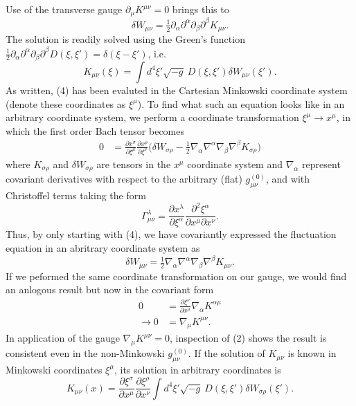 \documentclass[10pt,letterpaper]{article}
\begin{document}
Use of the transverse gauge $\partial_\mu K^{\mu\nu} = 0$ brings this to
\begin{equation}
	\delta W_{\mu\nu} =\tfrac12\partial_\alpha \partial^\alpha \partial_\beta\partial^\beta K_{\mu\nu}.
\end{equation}
 The solution is readily solved using the Green's function $\frac12\partial_\alpha \partial^\alpha \partial_\beta\partial^\beta D(\xi,\xi') = \delta (\xi-\xi')$, i.e.
\begin{equation}
	K_{\mu\nu}(\xi) = \int d^4\xi' \sqrt{-g} \ D(\xi,\xi')\delta W_{\mu\nu}(\xi').
\end{equation}
As written, (4) has been evaluted in the Cartesian Minkowski coordinate system (denote these coordinates as $\xi^\mu$). To find  what such an equation looks like in an arbitrary coordinate system, we perform a coordinate transformation $\xi^\mu \to x^\mu$, in which the first order Bach tensor becomes
\begin{align}
 0 &= \frac{\partial x^\sigma}{\partial \xi^\mu}\frac{\partial x^\rho}{\partial \xi^\nu}\big(\delta W_{\sigma\rho} - \tfrac12 \nabla_\alpha \nabla^\alpha \nabla_\beta \nabla^\beta K_{\sigma\rho} \big)
 \end{align}
 where $K_{\sigma\rho}$ and $\delta W_{\sigma\rho}$ are tensors in the $x^\mu$ coordinate system and $\nabla_\alpha$ represent covariant derivatives with respect to the arbitrary (flat) $g_{\mu\nu}^{(0)}$, and  with Christoffel terms taking the form
 \begin{equation}
 \Gamma^\lambda_{\mu\nu} =  \frac{\partial x^\lambda}{\partial \xi^\alpha} \frac{\partial^2 \xi^\alpha}{\partial x^\mu\partial x^\nu}.
 \end{equation}
 Thus, by only starting with (4), we have covariantly expressed the fluctuation equation in an abritrary coordinate system as
 \begin{equation}
 \delta W_{\mu\nu} = \tfrac12 \nabla_\alpha \nabla^\alpha \nabla_\beta \nabla^\beta K_{\mu\nu}.
 \end{equation}
 If we peformed the same coordinate transformation on our gauge, we would find an anlogous result but now in the covariant form
 \begin{align}
 	0&= \frac{\partial \xi^\nu}{\partial x^\mu}\nabla_\alpha K^{\alpha\mu}\\
 	\to 0&=\nabla_\mu K^{\mu\nu}.
\end{align}
In application of the gauge $\nabla_\mu K^{\mu\nu}=0$, inspection of (2) shows the result is consistent even in the non-Minkowski $g_{\mu\nu}^{(0)}$. If the solution of $K_{\mu\nu}$ is known in Minkowski coordinates $\xi^\mu$, its solution in arbitrary coordinates is
\begin{equation}
	K_{\mu\nu}(x) =  \frac{\partial \xi^\sigma}{\partial x^\mu}\frac{\partial \xi^\rho}{\partial x^\nu}\int d^4\xi' \sqrt{-g} \ D(\xi,\xi')\delta W_{\sigma\rho}(\xi').
\end{equation}
\\ 
\end{document}
